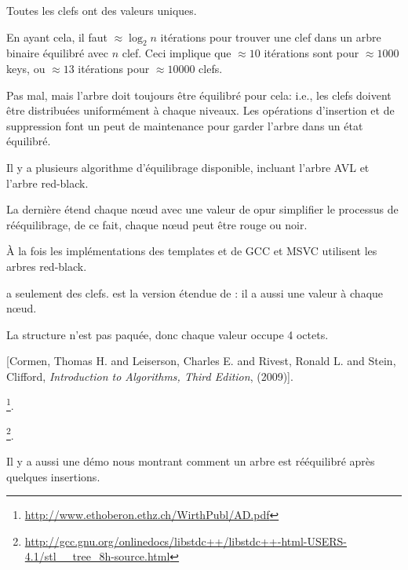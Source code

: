 Toutes les clefs ont des valeurs uniques.

En ayant cela, il faut $\approx \log_{2} n$ itérations pour trouver une clef dans
un arbre binaire équilibré avec $n$ clef.
Ceci implique que $\approx 10$ itérations sont pour $\approx 1000$ keys, ou $\approx 13$
itérations pour $\approx 10000$ clefs.

Pas mal, mais l'arbre doit toujours être équilibré pour cela: i.e., les clefs doivent
être distribuées uniformément à chaque niveaux.
Les opérations d'insertion et de suppression font un peut de maintenance pour garder
l'arbre dans un état équilibré.

Il y a plusieurs algorithme d'équilibrage disponible, incluant l'arbre AVL et l'arbre red-black.

La dernière étend chaque n\oe{}ud avec une valeur de  opur simplifier
le processus de rééquilibrage, de ce fait, chaque n\oe{}ud peut être rouge ou noir.

À la fois les implémentations des templates  et  de GCC
et MSVC utilisent les arbres red-black.

 a seulement des clefs.
 est la version étendue de : il a aussi une valeur à chaque
n\oe{}ud.






La structure n'est pas paquée, donc chaque valeur \Tchar occupe 4 octets.





[Cormen, Thomas H. and Leiserson, Charles E. and Rivest, Ronald L. and Stein, Clifford,
\emph{Introduction to Algorithms, Third Edition}, (2009)].

\footnote{\url{http://www.ethoberon.ethz.ch/WirthPubl/AD.pdf}}.







\footnote{\url{http://gcc.gnu.org/onlinedocs/libstdc++/libstdc++-html-USERS-4.1/stl__tree_8h-source.html}}.



Il y a aussi une démo nous montrant comment un arbre est rééquilibré après quelques
insertions.





